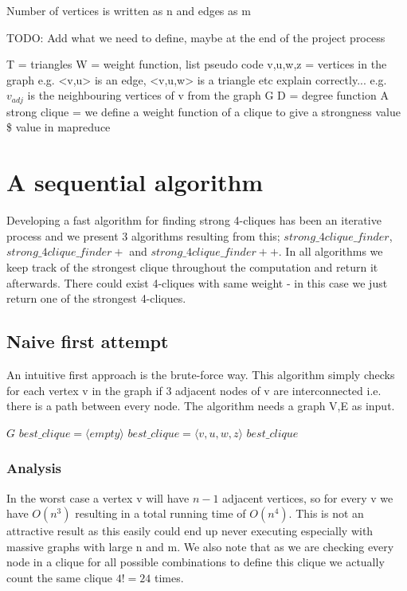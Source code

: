 \documentclass{article}
\begin{document}
Number of vertices is written as n and edges as m

TODO: Add what we need to define, maybe at the end of the project process

T = triangles
W = weight function, list pseudo code
v,u,w,z = vertices in the graph
e.g. <v,u> is an edge, <v,u,w> is a triangle etc explain correctly...
e.g. $v_{adj}$ is the neighbouring vertices of v from the graph G
D = degree function
A strong clique = we define a weight function of a clique to give a strongness value
\$ value in mapreduce


\section{A sequential algorithm}
Developing a fast algorithm for finding strong 4-cliques has been an iterative process and we present 3 algorithms resulting from this; $strong\_4clique\_finder$, $strong\_4clique\_finder+$ and $strong\_4clique\_finder++$. In all algorithms we keep track of the strongest clique throughout the computation and return it afterwards. There could exist 4-cliques with same weight - in this case we just return one of the strongest 4-cliques.

\subsection{Naive first attempt}
An intuitive first approach is the brute-force way. This algorithm simply checks for each vertex v in the graph if 3 adjacent nodes of v are interconnected i.e. there is a path between every node. The algorithm needs a graph V,E as input.

\begin{algorithm}
\caption{$strong\_4clique\_finder$}
\begin{algorithmic}
\REQUIRE $G$
\STATE $best\_clique = \langle empty\rangle $
\STATE $best\_clique = \langle v,u,w,z\rangle $
\ENDIF
\ENDIF
\ENDFOR
\ENDIF
\ENDFOR
\ENDFOR
\ENDFOR
\RETURN $best\_clique$
\end{algorithmic}
\end{algorithm}

\subsubsection{Analysis}
In the worst case a vertex v will have $n-1$ adjacent vertices, so for every v we have $O(n^{3})$ resulting in a total running time of $O(n^{4})$. This is not an attractive result as this easily could end up never executing especially with massive graphs with large n and m. We also note that as we are checking every node in a clique for all possible combinations to define this clique we actually count the same clique $4! = 24$ times.
\end{document}
